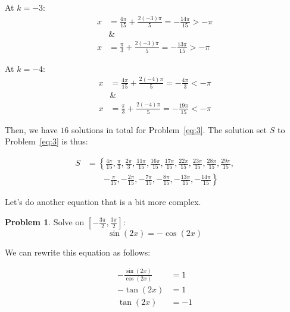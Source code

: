 \documentclass[12pt]{article}
\theoremstyle{definition}
\newtheorem{problem}{Problem}
\begin{document}
At $k=-3$:
\begin{align}
    x & =\frac{4\pi}{15} + \frac{2(-3)\pi}{5} = -\frac{14\pi}{15} > -\pi \\
      & \&                                                               \\
    x & =\frac{\pi}{3} + \frac{2(-3)\pi}{5} = -\frac{13\pi}{15} > -\pi
\end{align}

At $k=-4$:
\begin{align}
    x & =\frac{4\pi}{15} + \frac{2(-4)\pi}{5} = -\frac{4\pi}{3} < -\pi \\
      & \&                                                             \\
    x & =\frac{\pi}{3} + \frac{2(-4)\pi}{5} = -\frac{19\pi}{15} < -\pi
\end{align}

Then, we have $16$ solutions in total for Problem~\eqref{eq:3}.
The solution set $S$ to Problem~\eqref{eq:3} is thus:

\begin{equation}
    \begin{aligned}
        S & = \left\{ \frac{4\pi}{15}, \frac{\pi}{3}, \frac{2\pi}{3}, \frac{11\pi}{15}, \frac{16\pi}{15}, \frac{17\pi}{15}, \frac{22\pi}{15}, \frac{23\pi}{15}, \frac{28\pi}{15}, \frac{29\pi}{15}, \right. \\
          & \qquad \left. -\frac{\pi}{15}, -\frac{2\pi}{15}, -\frac{7\pi}{15}, -\frac{8\pi}{15}, -\frac{13\pi}{15}, -\frac{14\pi}{15} \right\}
    \end{aligned}
\end{equation}

Let's do another equation that is a bit more complex.

\begin{problem}
Solve on $\displaystyle \left[-\frac{3\pi}{2}, \frac{3\pi}{2}\right]$:
\begin{equation*}
    \sin(2x) = -\cos(2x) \label{eq:4}
\end{equation*}
\end{problem}

We can rewrite this equation as follows:

\begin{align}
    -\frac{\sin(2x)}{\cos(2x)} & = 1  \\
    -\tan(2x)                  & = 1  \\
    \tan(2x)                   & = -1
\end{align}
\end{document}

